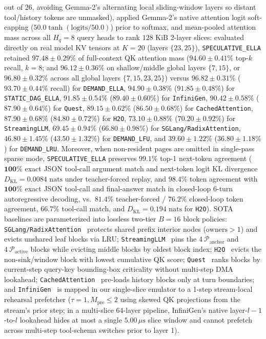 \documentclass[conference,10pt]{IEEEtran}
\begin{document}
\begin{itemize}
out of 26, avoiding Gemma-2's alternating local sliding-window layers so distant tool/history tokens are unmasked), applied Gemma-2's native attention logit soft-capping ($50.0\tanh(\text{logits}/50.0)$) prior to softmax, and mean-pooled attention mass across all $H_q=8$ query heads to rank $128\text{ KiB}$ 2-layer slices: evaluated directly on real model KV tensors at $K=20$ (layers $\{23, 25\}$), \texttt{SPECULATIVE\_ELLA} retained $\mathbf{97.48 \pm 0.29\%}$ of full-context QK attention mass ($\mathbf{94.60 \pm 0.41\%}$ top-$k$ recall, $k=8$; and $\mathbf{96.12 \pm 0.36\%}$ on shallow/middle global layers $\{7, 15\}$, or $\mathbf{96.80 \pm 0.32\%}$ across all global layers $\{7, 15, 23, 25\}$) versus $96.82 \pm 0.31\%$ ($93.70 \pm 0.44\%$ recall) for \texttt{DEMAND\_ELLA}, $94.90 \pm 0.38\%$ ($91.85 \pm 0.48\%$) for \texttt{STATIC\_DAG\_ELLA}, $91.85 \pm 0.54\%$ ($89.40 \pm 0.60\%$) for \texttt{InfiniGen}, $90.42 \pm 0.58\%$ ($87.90 \pm 0.64\%$) for \texttt{Quest}, $89.15 \pm 0.62\%$ ($86.50 \pm 0.68\%$) for \texttt{CachedAttention}, $87.90 \pm 0.68\%$ ($84.80 \pm 0.72\%$) for \texttt{H2O}, $73.10 \pm 0.88\%$ ($70.20 \pm 0.92\%$) for \texttt{StreamingLLM}, $69.45 \pm 0.94\%$ ($66.80 \pm 0.98\%$) for \texttt{SGLang/RadixAttention}, $46.80 \pm 1.45\%$ ($43.50 \pm 1.32\%$) for \texttt{DEMAND\_LFU}, and $39.60 \pm 1.22\%$ ($36.80 \pm 1.18\%$) for \texttt{DEMAND\_LRU}. Moreover, when non-resident pages are omitted in single-pass sparse mode, \texttt{SPECULATIVE\_ELLA} preserves $\mathbf{99.1\%}$ top-1 next-token agreement ($\mathbf{100\%}$ exact JSON tool-call argument match and next-token logit KL divergence $D_{\text{KL}} = 0.0084\text{ nats}$ under teacher-forced replay, and $\mathbf{98.4\%}$ token agreement with $\mathbf{100\%}$ exact JSON tool-call and final-answer match in closed-loop 6-turn autoregressive decoding, vs.\ $81.4\%$ teacher-forced / $76.2\%$ closed-loop token agreement, $66.7\%$ tool-call match, and $D_{\text{KL}} = 0.194\text{ nats}$ for \texttt{H2O}). SOTA baselines are parameterized into lossless two-tier $B=16$ block policies: \texttt{SGLang/RadixAttention}~\cite{zheng2024sglang} protects shared prefix interior nodes ($\text{owners} > 1$) and evicts unshared leaf blocks via LRU; \texttt{StreamingLLM}~\cite{xiao2023efficient} pins the $4\ \mathcal{P}_{\text{anchor}}$ and $4\ \mathcal{P}_{\text{active}}$ blocks while evicting middle blocks by oldest block index; \texttt{H2O}~\cite{zhang2023h2o} evicts the non-sink/window block with lowest cumulative QK score; \texttt{Quest}~\cite{tang2024quest} ranks blocks by current-step query-key bounding-box criticality without multi-step DMA lookahead; \texttt{CachedAttention}~\cite{gao2024cachedattention} pre-loads history blocks only at turn boundaries; and \texttt{InfiniGen}~\cite{lee2024infinigen} is mapped in our single-slice emulator to a 1-step stream-local rehearsal prefetcher ($\tau=1, M_{\text{pre}} \le 2$ using skewed QK projections from the stream's prior step; in a multi-slice 64-layer pipeline, InfiniGen's native layer-$l-1$-to-$l$ lookahead hides at most a single $5.00\,\mu\text{s}$ slice window and cannot prefetch across multi-step tool-schema switches prior to layer 1).
\end{itemize}
\end{document}
